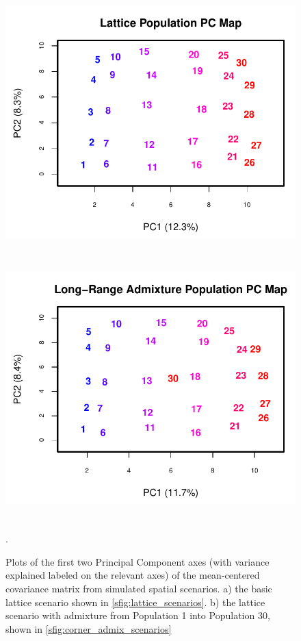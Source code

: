 \documentclass[10pt,letterpaper]{article}
\begin{document}
\begin{figure}
\centering
	\subcaptionbox{\label{lattice_pc}}
		{\includegraphics[width=5in,height=4in]{../figs/sims/lattice_PC_map.pdf}}
	\subcaptionbox{\label{cornerad_pc}}
			{\includegraphics[width=5in,height=4in]{../figs/sims/corneradmixture_PC_map.pdf}}
	\caption{Plots of the first two Principal Component axes (with variance explained labeled on the relevant axes) 
			of the mean-centered covariance matrix from simulated spatial scenarios.
			a) the basic lattice scenario shown in \ref{sfig:lattice_scenarios}.
			b) the lattice scenario with admixture from Population 1 into Population 30, 
				shown in \ref{sfig:corner_admix_scenarios}}.
	\label{sfig:sim_pc_maps}
\end{figure}
\end{document}

